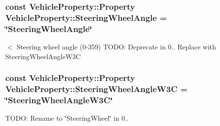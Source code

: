 \hypertarget{classVehicleProperty_aba4832663e4f850acbcf09c7cfbc6959}{
\subsubsection[{Steering\-Wheel\-Angle}]{\setlength{\rightskip}{0pt plus 5cm}const Vehicle\-Property\-::\-Property Vehicle\-Property\-::\-Steering\-Wheel\-Angle = \char`\"{}Steering\-Wheel\-Angle\char`\"{}\hspace{0.3cm}{\ttfamily [static]}}}\label{classVehicleProperty_aba4832663e4f850acbcf09c7cfbc6959}
$<$ Steering wheel angle (0-\/359) T\-O\-D\-O\-: Deprecate in 0.. Replace with Steering\-Wheel\-Angle\-W3\-C \hypertarget{classVehicleProperty_afb3708166c9863053de47a7dfcd0a09e}{
\subsubsection[{Steering\-Wheel\-Angle\-W3\-C}]{\setlength{\rightskip}{0pt plus 5cm}const Vehicle\-Property\-::\-Property Vehicle\-Property\-::\-Steering\-Wheel\-Angle\-W3\-C = \char`\"{}Steering\-Wheel\-Angle\-W3\-C\char`\"{}\hspace{0.3cm}{\ttfamily [static]}}}\label{classVehicleProperty_afb3708166c9863053de47a7dfcd0a09e}


T\-O\-D\-O\-: Rename to \char`\"{}\-Steering\-Wheel\char`\"{} in 0.. 

